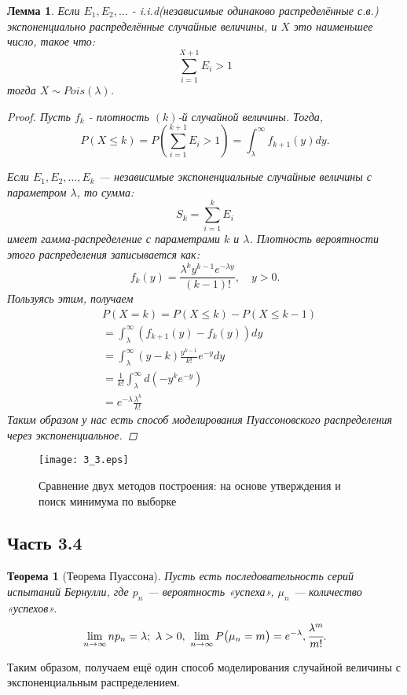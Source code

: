 \documentclass[11pt]{article}
\newtheorem{theorem}{Теорема}[section]
\newtheorem{lemma}{Лемма}[section]
\begin{document}
\begin{lemma}
 

Если $E_1, E_2, \ldots$ - i.i.d(независимые одинаково распределённые с.в.) экспоненциально распределённые случайные величины, и $X$ это наименьшее число, такое что:
$$
\sum_{i=1}^{X+1} E_i> 1
$$
тогда $X \sim Pois(\lambda)$.

\begin{proof}
 
Пусть $f_k$ - плотность $(k)$-й случайной величины. Тогда,
$$
P(X \leq k)=P\left(\sum_{i=1}^{k+1} E_i> 1 \right)=\int_\lambda^{\infty} f_{k+1}(y) d y .
$$

Если $ E_1, E_2, \ldots, E_k $ — независимые экспоненциальные случайные величины с параметром $ \lambda $, то сумма:
$$
S_k = \sum_{i=1}^k E_i
$$
имеет гамма-распределение с параметрами $k$ и $\lambda$. Плотность вероятности этого распределения записывается как:
$$
f_k(y) = \frac{\lambda^k y^{k-1} e^{-\lambda y}}{(k-1)!}, \quad y > 0.
$$
Пользуясь этим, получаем
$$
\begin{aligned}
& P(X=k)=P(X \leq k)-P(X \leq k-1) \\
& =\int_\lambda^{\infty}\left(f_{k+1}(y)-f_k(y)\right) d y \\
& =\int_\lambda^{\infty}(y-k) \frac{y^{k-1}}{k!} e^{-y} d y \\
& =\frac{1}{k!} \int_\lambda^{\infty} d\left(-y^k e^{-y}\right) \\
& =e^{-\lambda} \frac{\lambda^k}{k!}
\end{aligned}
$$
Таким образом у нас есть способ моделирования Пуассоновского распределения через экспоненциальное.
\end{proof}

\end{lemma}

\begin{figure}[ht]
    \texttt{[image: 3\_3.eps]} 
    \caption{Сравнение двух методов построения: на основе утверждения и поиск минимума по выборке}
\end{figure} 
\FloatBarrier




\subsection{Часть 3.4}
\begin{theorem}[Теорема Пуассона]
  Пусть есть последовательность серий испытаний Бернулли, где ${p_{n}}$ — вероятность «успеха», $\mu _{n}$ — количество «успехов».
$$
\lim_{n \to \infty} n p_n = \lambda ; \
\lambda > 0, \
\lim_{n \to \infty} P \bigl(\mu_n = m\bigr) = e^{-\lambda}, \cfrac {\lambda^m} {m!} .
$$
\end{theorem}
Таким образом, получаем ещё один способ моделирования случайной величины с экспоненциальным распределением.
\end{document}
